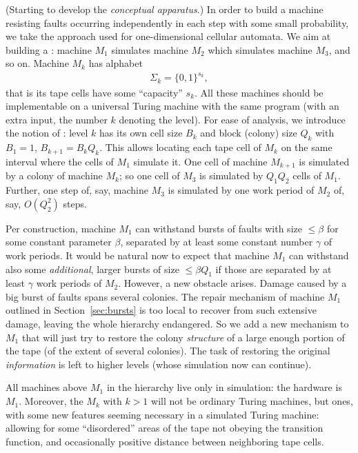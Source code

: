 \documentclass[11pt]{memoir}
\theoremstyle{definition} %
\renewcommand{\le}{\leq}
\def\B{B}
\newcommand{\Q}{Q} %
\begin{document}
(Starting to develop the \emph{conceptual apparatus}.)
In order to build a machine resisting faults 
occurring independently in each step with some small probability,
we take the approach used for one-dimensional cellular automata.
We aim at building a :
machine \( M_{1} \) simulates machine \( M_{2} \) which simulates machine \( M_{3} \), and so on.
Machine \( M_{k} \) has alphabet
\begin{align}\label{eq:Sigma_k}
   \Sigma_{k}=\{0,1\}^{s_{k}},
\end{align}
that is its tape cells have some ``capacity'' \( s_{k} \).
All these machines should be implementable on a universal Turing machine with
the same program (with an extra input, the number \( k \) denoting the level).
For ease of analysis, we introduce the notion of :
level \( k \) has its own cell size \( \B_{k} \) and block (colony) size \( \Q_{k} \)
with \( B_{1}=1 \), \( \B_{k+1}=\B_{k}\Q_{k} \).
This allows
locating each tape cell of \( M_{k} \) on the same interval where the cells of \( M_{1} \) simulate it.
One cell of machine \( M_{k+1} \) is simulated by a colony of machine \( M_{k} \);
so one cell of \( M_{3} \) is simulated by \( \Q_{1}\Q_{2} \) cells of \( M_{1} \).
Further, one step of, say, machine \( M_{3} \) is simulated by one
work period of \( M_{2} \) of, say, \( O(\Q_{2}^{2}) \) steps.

Per construction, machine \( M_{1} \) can withstand
bursts of faults with size  \( \le \beta \) for some constant parameter \( \beta \),
separated by at least some constant number \( \gamma \) of work periods.
It would be natural now to expect that machine
\( M_{1} \) can withstand also some \emph{additional}, larger bursts
of size \( \le \beta \Q_{1} \) if those are separated
by at least \( \gamma \) work periods of \( M_{2} \).
However, a new obstacle arises.
Damage caused by a big burst of faults spans several colonies.
The repair mechanism of machine \( M_{1} \) outlined in Section~\ref{sec:bursts} 
is too local to recover from such extensive damage, leaving
the whole hierarchy endangered.
So we add a new mechanism to \( M_{1} \) that
will just try to restore the colony \emph{structure} of a large enough portion of the
tape (of the extent of several colonies).
The task of restoring the original \emph{information} is left to higher levels (whose simulation
now can continue).

All machines above \( M_{1} \) in the hierarchy live only in simulation: the hardware is \( M_{1} \).
Moreover, the \( M_{k} \) with \( k>1 \)
will not be ordinary Turing machines, but  ones,
with some new features seeming necessary in a simulated Turing machine:
allowing for some ``disordered'' areas of the tape not obeying the transition function,
and occasionally positive distance between neighboring tape cells.
\end{document}
